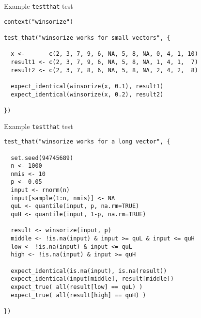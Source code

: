 \documentclass[12pt,t]{beamer}
\begin{document}
\begin{frame}[c,fragile]{Example {\tt testthat} test}


\begin{lstlisting}
context("winsorize")

test_that("winsorize works for small vectors", {

  x <-       c(2, 3, 7, 9, 6, NA, 5, 8, NA, 0, 4, 1, 10)
  result1 <- c(2, 3, 7, 9, 6, NA, 5, 8, NA, 1, 4, 1,  7)
  result2 <- c(2, 3, 7, 8, 6, NA, 5, 8, NA, 2, 4, 2,  8)

  expect_identical(winsorize(x, 0.1), result1)
  expect_identical(winsorize(x, 0.2), result2)

})
\end{lstlisting}



\end{frame}


\begin{frame}[c,fragile]{Example {\tt testthat} test}


\begin{lstlisting}
test_that("winsorize works for a long vector", {

  set.seed(94745689)
  n <- 1000
  nmis <- 10
  p <- 0.05
  input <- rnorm(n)
  input[sample(1:n, nmis)] <- NA
  quL <- quantile(input, p, na.rm=TRUE)
  quH <- quantile(input, 1-p, na.rm=TRUE)

  result <- winsorize(input, p)
  middle <- !is.na(input) & input >= quL & input <= quH
  low <- !is.na(input) & input <= quL
  high <- !is.na(input) & input >= quH

  expect_identical(is.na(input), is.na(result))
  expect_identical(input[middle], result[middle])
  expect_true( all(result[low] == quL) )
  expect_true( all(result[high] == quH) )

})
\end{lstlisting}



\end{frame}
\end{document}
